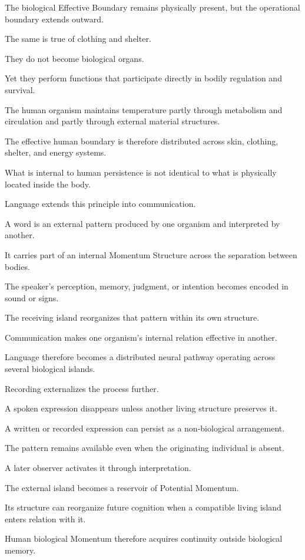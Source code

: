 The biological Effective Boundary remains physically present, but the operational boundary extends outward.

The same is true of clothing and shelter.

They do not become biological organs.

Yet they perform functions that participate directly in bodily regulation and survival.

The human organism maintains temperature partly through metabolism and circulation and partly through external material structures.

The effective human boundary is therefore distributed across skin, clothing, shelter, and energy systems.

What is internal to human persistence is not identical to what is physically located inside the body.

Language extends this principle into communication.

A word is an external pattern produced by one organism and interpreted by another.

It carries part of an internal Momentum Structure across the separation between bodies.

The speaker’s perception, memory, judgment, or intention becomes encoded in sound or signs.

The receiving island reorganizes that pattern within its own structure.

Communication makes one organism’s internal relation effective in another.

Language therefore becomes a distributed neural pathway operating across several biological islands.

Recording externalizes the process further.

A spoken expression disappears unless another living structure preserves it.

A written or recorded expression can persist as a non-biological arrangement.

The pattern remains available even when the originating individual is absent.

A later observer activates it through interpretation.

The external island becomes a reservoir of Potential Momentum.

Its structure can reorganize future cognition when a compatible living island enters relation with it.

Human biological Momentum therefore acquires continuity outside biological memory.

